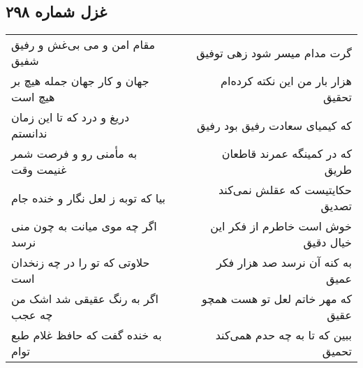 \begin{center}
\section*{غزل شماره ۲۹۸}
\label{sec:sh298}
\begin{longtable}{l p{0.5cm} r}
مقام امن و می بی‌غش و رفیق شفیق
&&
گرت مدام میسر شود زهی توفیق
\\
جهان و کار جهان جمله هیچ بر هیچ است
&&
هزار بار من این نکته کرده‌ام تحقیق
\\
دریغ و درد که تا این زمان ندانستم
&&
که کیمیای سعادت رفیق بود رفیق
\\
به مأمنی رو و فرصت شمر غنیمت وقت
&&
که در کمینگه عمرند قاطعان طریق
\\
بیا که توبه ز لعل نگار و خنده جام
&&
حکایتیست که عقلش نمی‌کند تصدیق
\\
اگر چه موی میانت به چون منی نرسد
&&
خوش است خاطرم از فکر این خیال دقیق
\\
حلاوتی که تو را در چه زنخدان است
&&
به کنه آن نرسد صد هزار فکر عمیق
\\
اگر به رنگ عقیقی شد اشک من چه عجب
&&
که مهر خاتم لعل تو هست همچو عقیق
\\
به خنده گفت که حافظ غلام طبع توام
&&
ببین که تا به چه حدم همی‌کند تحمیق
\\
\end{longtable}
\end{center}
